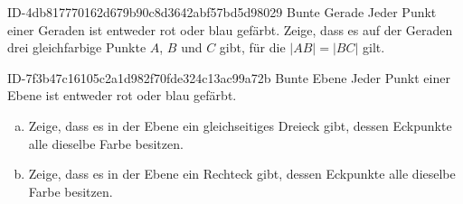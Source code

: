\begin{exercise}
      {ID-4db817770162d679b90c8d3642abf57bd5d98029}
      {Bunte Gerade}
  \ifproblem\problem
    Jeder Punkt einer Geraden ist entweder rot oder blau gefärbt.
    Zeige, dass es auf der Geraden drei gleichfarbige Punkte $A$,
    $B$ und $C$ gibt, für die $|AB|=|BC|$ gilt.
  \fi
\end{exercise}

\begin{exercise}
      {ID-7f3b47c16105c2a1d982f70fde324c13ac99a72b}
      {Bunte Ebene}
  \ifproblem\problem
    Jeder Punkt einer Ebene ist entweder rot oder blau gefärbt.
    \begin{enumerate}[a)]
      \item Zeige, dass es in der Ebene ein gleichseitiges Dreieck gibt,
            dessen Eckpunkte alle dieselbe Farbe besitzen.
      \item Zeige, dass es in der Ebene ein Rechteck gibt,
            dessen Eckpunkte alle dieselbe Farbe besitzen.
    \end{enumerate}
  \fi
\end{exercise}

